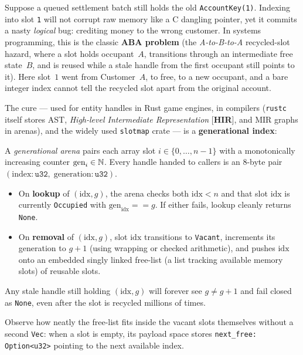 Suppose a queued settlement batch still holds the old \texttt{AccountKey(1)}. Indexing into slot \texttt{1} will not corrupt raw memory like a C dangling pointer, yet it commits a nasty \emph{logical} bug: crediting money to the wrong customer. In systems programming, this is the classic \textbf{ABA problem} (the \emph{A-to-B-to-A} recycled-slot hazard, where a slot holds occupant~$A$, transitions through an intermediate free state~$B$, and is reused while a stale handle from the first occupant still points to it). Here slot~$1$ went from Customer~$A$, to free, to a new occupant, and a bare integer index cannot tell the recycled slot apart from the original account.

The cure --- used for entity handles in Rust game engines, in compilers (\texttt{rustc} itself stores AST, \emph{High-level Intermediate Representation} [\textbf{HIR}], and MIR graphs in arenas), and the widely used \texttt{slotmap} crate --- is a \textbf{generational index}:

\begin{definition}
A \emph{generational arena} pairs each array slot $i \in \{0, \dots, n-1\}$ with a monotonically increasing counter $\text{gen}_i \in \mathbb{N}$. Every handle handed to callers is an 8-byte pair $(\text{index}: \texttt{u32},\; \text{generation}: \texttt{u32})$.
\begin{itemize}
  \item On \textbf{lookup} of $(\text{idx}, g)$, the arena checks both $\text{idx} < n$ and that slot $\text{idx}$ is currently \texttt{Occupied} with $\text{gen}_{\text{idx}} == g$. If either fails, lookup cleanly returns \texttt{None}.
  \item On \textbf{removal} of $(\text{idx}, g)$, slot $\text{idx}$ transitions to \texttt{Vacant}, increments its generation to $g + 1$ (using wrapping or checked arithmetic), and pushes $\text{idx}$ onto an embedded singly linked free-list (a list tracking available memory slots) of reusable slots.
\end{itemize}
Any stale handle still holding $(\text{idx}, g)$ will forever see $g \neq g + 1$ and fail closed as \texttt{None}, even after the slot is recycled millions of times.
\end{definition}

Observe how neatly the free-list fits inside the vacant slots themselves without a second \texttt{Vec}: when a slot is empty, its payload space stores \texttt{next\_free: Option<u32>} pointing to the next available index.

